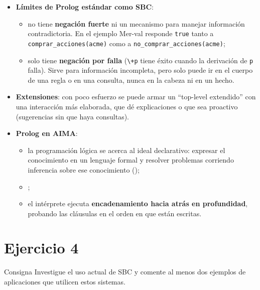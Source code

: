 \documentclass[11pt,a4paper]{article}
\newcommand{\naf}{\textbackslash+}
\begin{document}
\begin{extras}
\begin{itemize}
  \item \textbf{Límites de Prolog estándar como SBC}:
  \begin{itemize}
    \item no tiene \textbf{negación fuerte} ni un mecanismo para manejar información contradictoria. En el ejemplo Mer-val responde \texttt{true} tanto a \texttt{comprar\_acciones(acme)} como a \texttt{no\_comprar\_acciones(acme)};
    \item solo tiene \textbf{negación por falla} (\texttt{\naf p} tiene éxito cuando la derivación de \texttt{p} falla). Sirve para información incompleta, pero solo puede ir en el cuerpo de una regla o en una consulta, nunca en la cabeza ni en un hecho.
  \end{itemize}
  \item \textbf{Extensiones}: con poco esfuerzo se puede armar un ``top-level extendido'' con una interacción más elaborada, que dé explicaciones o que sea proactivo (sugerencias sin que haya consultas).
  \item \textbf{Prolog en AIMA}:
  \begin{itemize}
    \item la programación lógica se acerca al ideal declarativo: expresar el conocimiento en un lenguaje formal y resolver problemas corriendo inferencia sobre ese conocimiento ();
    \item {};
    \item el intérprete ejecuta \textbf{encadenamiento hacia atrás en profundidad}, probando las cláusulas en el orden en que están escritas.
  \end{itemize}
\end{itemize}
\end{extras}

\section{Ejercicio 4}

\begin{enunciado}{Consigna}
Investigue el uso actual de SBC y comente al menos dos ejemplos de aplicaciones que utilicen estos sistemas.
\end{enunciado}
\end{document}
